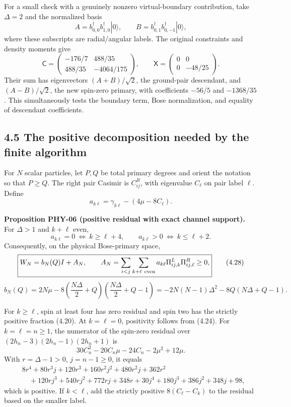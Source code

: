For a small check with a genuinely nonzero virtual-boundary contribution, take \(\Delta=2\) and the normalized basis \[
A=b^\dagger_{0,0}b^\dagger_{1,0}|0\rangle,\qquad
B=b^\dagger_{0,1}b^\dagger_{0,-1}|0\rangle ,
\] where these subscripts are radial/angular labels. The original constraints and density moments give \[
\mathsf C=
\begin{pmatrix}-176/7&488/35\\488/35&-4064/175\end{pmatrix},
\qquad
\mathsf X=
\begin{pmatrix}0&0\\0&-48/25\end{pmatrix}.
\tag{4.25}
\] Their sum has eigenvectors \((A+B)/\sqrt2\), the ground-pair descendant, and \((A-B)/\sqrt2\), the new spin-zero primary, with coefficients \(-56/5\) and \(-1368/35\). This simultaneously tests the boundary term, Bose normalization, and equality of descendant coefficients.

\hypertarget{the-positive-decomposition-needed-by-the-finite-algorithm}{%
\subsection{4.5 The positive decomposition needed by the finite algorithm}\label{the-positive-decomposition-needed-by-the-finite-algorithm}}

For \(N\) scalar particles, let \(P,Q\) be total primary degrees and orient the notation so that \(P\ge Q\). The right pair Casimir is \(C_{ij}^R\), with eigenvalue \(C_\ell\) on pair label \(\ell\). Define \[
a_{k\ell}=\gamma_{k\ell}-(4\mu-8C_\ell).
\tag{4.26}
\]

\textbf{Proposition PHY-06 (positive residual with exact channel support).} For \(\Delta>1\) and \(k+\ell\) even, \[
a_{k\ell}=0\ \Longleftrightarrow\ k\ge\ell+4,
\qquad
a_{k\ell}>0\ \Longleftrightarrow\ k\le\ell+2.
\tag{4.27}
\] Consequently, on the physical Bose-primary space, \[
\boxed{
W_N=b_N(Q)I+A_N,\qquad
A_N=\sum_{i<j}\sum_{k+\ell\ {\rm even}}
a_{k\ell}\Pi^L_{ij,k}\Pi^R_{ij,\ell}\ge0 ,
}
\tag{4.28}
\] \[
\boxed{
b_N(Q)=2N\mu-
8\left(\frac{N\Delta}{2}+Q\right)
\left(\frac{N\Delta}{2}+Q-1\right)
=-2N(N-1)\Delta^2-8Q(N\Delta+Q-1).
}
\tag{4.29}
\]

For \(k\ge\ell\), spin at least four has zero residual and spin two has the strictly positive fraction (4.20). At \(k=\ell=0\), positivity follows from (4.24). For \(k=\ell=n\ge1\), the numerator of the spin-zero residual over \((2h_n-3)(2h_n-1)(2h_n+1)\) is \[
30C_n^2-20C_n\mu-24C_n-2\mu^2+12\mu .
\] With \(r=\Delta-1>0\), \(j=n-1\ge0\), it equals \[
\begin{aligned}
&8r^4+80r^3j+120r^3+160r^2j^2+480r^2j+362r^2\\
&\quad+120rj^3+540rj^2+772rj+348r
+30j^4+180j^3+386j^2+348j+98,
\end{aligned}
\tag{4.30}
\] which is positive. If \(k<\ell\), add the strictly positive \(8(C_\ell-C_k)\) to the residual based on the smaller label.

